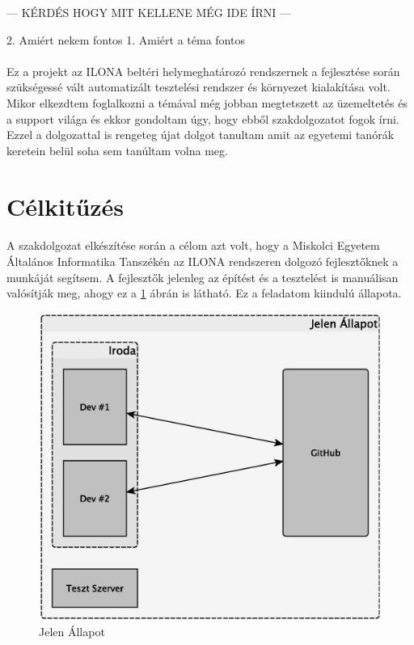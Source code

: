 --- KÉRDÉS HOGY MIT KELLENE MÉG IDE ÍRNI ---

2. Amiért nekem fontos
1. Amiért a téma fontos

\paragraph{}
Ez a projekt az ILONA beltéri helymeghatározó rendszernek a fejlesztése során szükségessé vált automatizált tesztelési rendszer és környezet kialakítása volt. 
Mikor elkezdtem foglalkozni a témával még jobban megtetszett az üzemeltetés és a support világa és ekkor gondoltam úgy, hogy ebből szakdolgozatot fogok írni. 
Ezzel a dolgozattal is rengeteg újat dolgot tanultam amit az egyetemi tanórák keretein belül soha sem tanúltam volna meg. 

\pagebreak
\section{Célkitűzés}
\paragraph{}
A szakdolgozat elkészítése során a célom azt volt, hogy a Miskolci Egyetem Általános Informatika Tanszékén az ILONA rendszeren dolgozó fejlesztőknek a munkáját segítsem. 
A fejlesztők jelenleg az építést és a tesztelést is manuálisan valósítják meg, ahogy ez a \ref{fig:jelenallapot} ábrán is látható. Ez a feladatom kiindulú állapota. 

\begin{figure}[h]
	\centering
	\includegraphics[width=0.7\linewidth]{figures/jelenallapot}
	\caption{Jelen Állapot}
	\label{fig:jelenallapot}
\end{figure}

